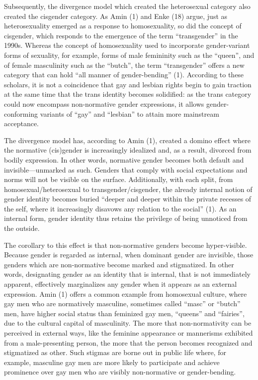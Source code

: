 \documentclass[11pt]{article}
\begin{document}
Subsequently, the divergence model which created the heterosexual category also created the cisgender category. As Amin (1) and Enke (18) argue, just as heterosexuality emerged as a response to homosexuality, so did the concept of cisgender, which responds to the emergence of the term “transgender” in the 1990s. Whereas the concept of homosexuality used to incorporate gender-variant forms of sexuality, for example, forms of male femininity such as the “queen”, and of female masculinity such as the “butch”, the term “transgender” offers a new category that can hold “all manner of gender-bending” (1). According to these scholars, it is not a coincidence that gay and lesbian rights begin to gain traction at the same time that the trans identity becomes solidified: as the trans category could now encompass non-normative gender expressions, it allows gender-conforming variants of “gay” and “lesbian” to attain more mainstream acceptance. 

The divergence model has, according to Amin (1), created a domino effect where the normative (cis)gender is increasingly idealized and, as a result, divorced from bodily expression. In other words, normative gender becomes both default and invisible—unmarked as such. Genders that comply with social expectations and norms will not be visible on the surface. Additionally, with each split, from homosexual/heterosexual to transgender/cisgender, the already internal notion of gender identity becomes buried “deeper and deeper within the private recesses of the self, where it increasingly disavows any relation to the social” (1). As an internal form, gender identity thus retains the privilege of being unnoticed from the outside.      

The corollary to this effect is that non-normative genders become hyper-visible. Because gender is regarded as internal, when dominant gender are invisible, those genders which are non-normative become marked and stigmatized. In other words, designating gender as an identity that is internal, that is not immediately apparent, effectively marginalizes any gender when it appears as an external expression. Amin (1) offers a common example from homosexual culture, where gay men who are normatively masculine, sometimes called “masc” or “butch” men, have higher social status than feminized gay men, “queens” and “fairies”, due to the cultural capital of masculinity. The more that non-normativity can be perceived in external ways, like the feminine appearance or mannerisms exhibited from a male-presenting person, the more that the person becomes recognized and stigmatized as other. Such stigmas are borne out in public life where, for example, masculine gay men are more likely to participate and achieve prominence over gay men who are visibly non-normative or gender-bending.
\end{document}
